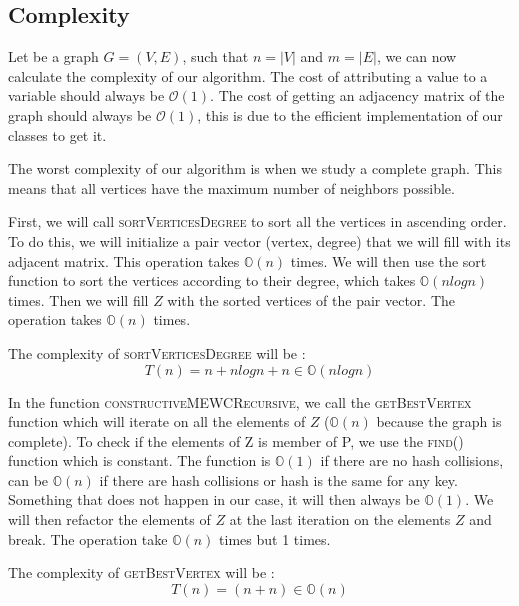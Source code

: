
\subsection{Complexity}

Let be a graph $G = (V,E)$, such that $n =|V|$ and $m = |E|$, we can now calculate the complexity of our algorithm. The cost of attributing a value to a variable should always be $\mathcal{O}(1)$. The cost of getting an adjacency matrix of the graph should always be $\mathcal{O}(1)$, this is due to the efficient implementation of our classes to get it.
\bigskip

The worst complexity of our algorithm is when we study a complete graph. This means that all vertices have the maximum number of neighbors possible.
\bigskip

First, we will call \textsc{sortVerticesDegree} to sort all the vertices in ascending order. To do this, we will initialize a pair vector (vertex, degree) that we will fill with its adjacent matrix. This operation takes $\mathbb{O}(n)$ times. We will then use the sort function to sort the vertices according to their degree, which takes $\mathbb{O}(nlogn)$ times\footnotemark. Then we will fill $Z$ with the sorted vertices of the pair vector. The operation takes $\mathbb{O}(n)$ times.
\bigskip

The complexity of \textsc{sortVerticesDegree} will be :
\begin{equation}
    T(n) = n + nlogn + n \in \mathbb{O}(nlogn)
\end{equation}

In the function \textsc{constructiveMEWCRecursive}, we call the \textsc{getBestVertex} function which will iterate on all the elements of $Z$ ($\mathbb{O}(n)$ because the graph is complete). To check if the elements of Z is member of P, we use the \textsc{find()} function which is constant\footnotemark. The function is $\mathbb{O}(1)$ if there are no hash collisions, can be $\mathbb{O}(n)$ if there are hash collisions or hash is the same for any key. Something that does not happen in our case, it will then always be $\mathbb{O}(1)$. We will then refactor the elements of $Z$ at the last iteration on the elements $Z$ and break. The operation take $\mathbb{O}(n)$ times but 1 times.
\bigskip

The complexity of \textsc{getBestVertex} will be :
\begin{equation}
    T(n) = (n+n) \in \mathbb{O}(n)
\end{equation}

